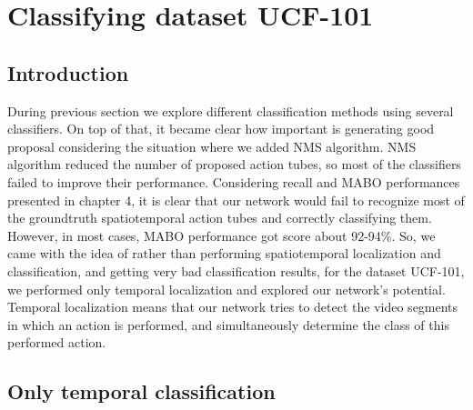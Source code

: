 \section{Classifying dataset UCF-101}
\subsection{Introduction}
During previous section we explore different classification methods using several classifiers. On top of that, it became clear how important is generating good proposal considering the situation
where we added NMS algorithm. NMS algorithm reduced the number of proposed action tubes, so most of the classifiers failed to improve their performance. Considering recall and MABO performances presented
in chapter 4, it is clear that our network would fail to recognize most of the groundtruth spatiotemporal action tubes and correctly classifying them. However, in most cases, MABO performance
got score about 92-94\%. So, we came with the idea of rather than performing spatiotemporal localization and classification, and getting very bad classification results, for the dataset UCF-101, we performed
only temporal localization and explored our network's potential. Temporal localization  means that  our network tries to detect the video segments in which an action is performed, and simultaneously
determine the class of this performed action.


\subsection{Only temporal classification}

